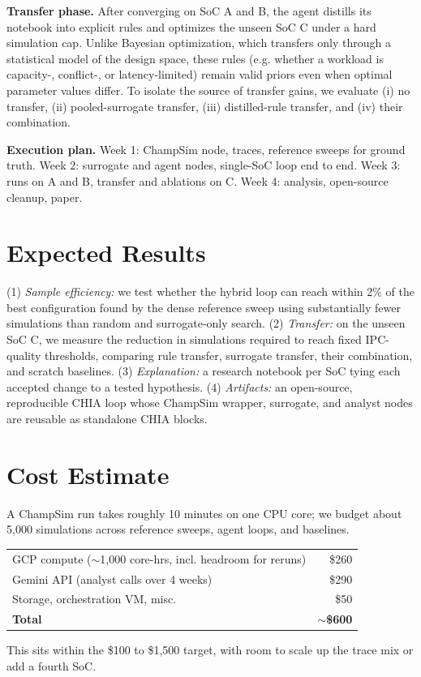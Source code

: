 \documentclass[10pt]{article}
\begin{document}
\textbf{Transfer phase.} After converging on SoC A and B, the agent distills its notebook into explicit rules and optimizes the unseen SoC C under a hard simulation cap. Unlike Bayesian optimization, which transfers only through a statistical model of the design space, these rules (e.g. whether a workload is capacity-, conflict-, or latency-limited) remain valid priors even when optimal parameter values differ. To isolate the source of transfer gains, we evaluate (i) no transfer, (ii) pooled-surrogate transfer, (iii) distilled-rule transfer, and (iv) their combination.

\textbf{Execution plan.} Week 1: ChampSim node, traces, reference sweeps for ground truth. Week 2: surrogate and agent nodes, single-SoC loop end to end. Week 3: runs on A and B, transfer and ablations on C. Week 4: analysis, open-source cleanup, paper.

\section{Expected Results}
(1) \emph{Sample efficiency:} we test whether the hybrid loop can reach within 2\% of the best configuration found by the dense reference sweep using substantially fewer simulations than random and surrogate-only search.
(2) \emph{Transfer:} on the unseen SoC C, we measure the reduction in simulations required to reach fixed IPC-quality thresholds, comparing rule transfer, surrogate transfer, their combination, and scratch baselines.
(3) \emph{Explanation:} a research notebook per SoC tying each accepted change to a tested hypothesis.
(4) \emph{Artifacts:} an open-source, reproducible CHIA loop whose ChampSim wrapper, surrogate, and analyst nodes are reusable as standalone CHIA blocks.

\section{Cost Estimate}
A ChampSim run takes roughly 10 minutes on one CPU core; we budget about 5{,}000 simulations across reference sweeps, agent loops, and baselines.

\begin{center}
\begin{tabular}{lr}
\toprule
GCP compute ($\sim$1{,}000 core-hrs, incl. headroom for reruns) & \$260 \\
Gemini API (analyst calls over 4 weeks) & \$290 \\
Storage, orchestration VM, misc. & \$50 \\
\midrule
\textbf{Total} & \textbf{$\sim$\$600} \\
\bottomrule
\end{tabular}
\end{center}

This sits within the \$100 to \$1{,}500 target, with room to scale up the trace mix or add a fourth SoC.
\end{document}
